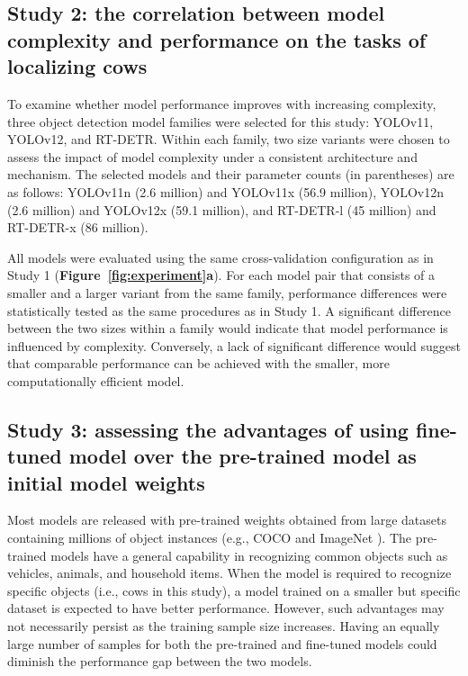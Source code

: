 \subsection*{Study 2: the correlation between model complexity and performance on the tasks of localizing cows}

To examine whether model performance improves with increasing complexity, three object detection model families were selected for this study: YOLOv11, YOLOv12, and RT-DETR. Within each family, two size variants were chosen to assess the impact of model complexity under a consistent architecture and mechanism. The selected models and their parameter counts (in parentheses) are as follows: YOLOv11n (2.6 million) and YOLOv11x (56.9 million), YOLOv12n (2.6 million) and YOLOv12x (59.1 million), and RT-DETR-l (45 million) and RT-DETR-x (86 million).

All models were evaluated using the same cross-validation configuration as in Study 1 (\textbf{Figure~\ref{fig:experiment}a}). For each model pair that consists of a smaller and a larger variant from the same family, performance differences were statistically tested as the same procedures as in Study 1. A significant difference between the two sizes within a family would indicate that model performance is influenced by complexity. Conversely, a lack of significant difference would suggest that comparable performance can be achieved with the smaller, more computationally efficient model.

\subsection*{Study 3: assessing the advantages of using fine-tuned model over the pre-trained model as initial model weights}

Most models are released with pre-trained weights obtained from large datasets containing millions of object instances (e.g., COCO \cite{lin2014microsoft} and ImageNet \cite{deng2009imagenet}). The pre-trained models have a general capability in recognizing common objects such as vehicles, animals, and household items. When the model is required to recognize specific objects (i.e., cows in this study), a model trained on a smaller but specific dataset is expected to have better performance. However, such advantages may not necessarily persist as the training sample size increases. Having an equally large number of samples for both the pre-trained and fine-tuned models could diminish the performance gap between the two models.

